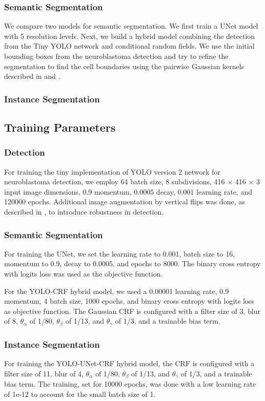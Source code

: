 \documentclass[journal]{IEEEtran}
\begin{document}
\subsubsection{Semantic Segmentation}
We compare two models for semantic segmentation. We first train a UNet model with 5 resolution levels. Next, we build a hybrid model combining the detection from the Tiny YOLO network and conditional random fields. We use the initial bounding boxes from the neuroblastoma detection and try to refine the segmentation to find the cell boundaries using the pairwise Gaussian kernels described in \cite{NIPS2011_4296} and \cite{Teichmann2018ConvolutionalCF}.
\subsubsection{Instance Segmentation}
\subsection{Training Parameters}
\subsubsection{Detection}
For training the tiny implementation of YOLO version 2 network for neuroblastoma detection, we employ 64 batch size, 8 subdivisions, 416 $\times$ 416 $\times$ 3 input image dimensions, 0.9 momentum, 0.0005 decay, 0.001 learning rate, and 120000 epochs. Additional image augmentation by vertical flips was done, as described in \cite{Waithe544833}, to introduce robustness in detection.
\subsubsection{Semantic Segmentation}
For training the UNet, we set the learning rate to 0.001, batch size to 16, momentum to 0.9, decay to 0.0005, and epochs to 8000. The binary cross entropy with logits loss was used as the objective function.

For the YOLO-CRF hybrid model, we used a 0.00001 learning rate, 0.9 momentum, 4 batch size, 1000 epochs, and binary cross entropy with logits loss as objective function. The Gaussian CRF is configured with a filter size of 3, blur of 8, $\theta_\alpha$ of 1/80, $\theta_\beta$ of 1/13, and $\theta_\gamma$ of 1/3, and a trainable bias term.
\subsubsection{Instance Segmentation}
For training the YOLO-UNet-CRF hybrid model, the CRF is configured with a filter size of 11, blur of 4, $\theta_\alpha$ of 1/80, $\theta_\beta$ of 1/13, and $\theta_\gamma$ of 1/3, and a trainable bias term. The training, set for 10000 epochs, was done with a low learning rate of 1e-12 to account for the small batch size of 1. 
\end{document}
